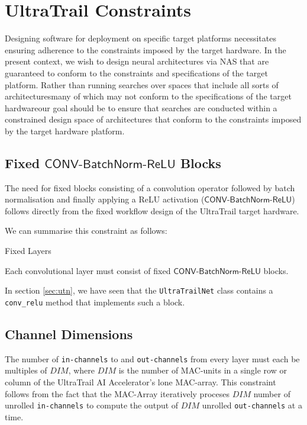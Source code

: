 \documentclass[11pt,a4paper, open=any]{scrbook}
\newcounter{constraint}[chapter]
\newenvironment{constraintbox}[2]{%
	\refstepcounter{constraint}%
	\begin{constraintboxbase}{#1}\label{constr:#2}%
	}{%
	\end{constraintboxbase}%
}
\newcommand{\py}[1]{\texttt{#1}}
\begin{document}
\section{UltraTrail Constraints}\label{sec:con}
Designing software for deployment on specific target platforms necessitates ensuring adherence to the constraints imposed by the target hardware. In the present context, we wish to design neural architectures via NAS that are guaranteed to conform to the constraints and specifications of the target platform. Rather than running searches over spaces that include all sorts of architectures\textemdash  many of which may not conform to the specifications of the target hardware\textemdash our goal should be to ensure that searches are conducted within a constrained design space of architectures that conform to the constraints imposed by the target hardware platform.

\subsection{Fixed $\mathsf{CONV\mbox{-}BatchNorm\mbox{-}ReLU}$ Blocks}\label{constraint_fixed_blocks}
The need for fixed blocks consisting of a convolution operator followed by batch normalisation and finally applying a ReLU activation ($\mathsf{CONV\mbox{-}BatchNorm\mbox{-}ReLU}$) follows directly from the fixed workflow design of the UltraTrail target hardware. 

We can summarise this constraint as follows:

\begin{constraintbox}{Fixed Layers}{fix}
	Each convolutional layer must consist of fixed $\mathsf{CONV\mbox{-}BatchNorm\mbox{-}ReLU}$ blocks.
\end{constraintbox}

In section \ref{sec:utn}, we have seen that the \py{UltraTrailNet} class contains a \py{conv_relu} method that implements such a block.

\subsection{Channel Dimensions}\label{constraint_dim}
The number of \texttt{in-channels} to and \texttt{out-channels} from every layer must each be multiples of $DIM$, where $DIM$ is the number of MAC-units in a single row or column of the UltraTrail AI Accelerator's lone MAC-array. This constraint follows from the fact that the MAC-Array iteratively proceses $DIM$ number of unrolled \texttt{in-channels} to compute the output of $DIM$ unrolled \texttt{out-channels} at a time.
\end{document}
